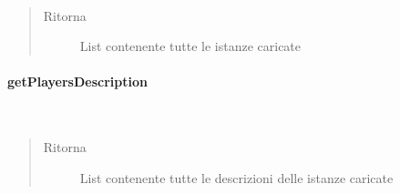 \documentclass[letterpaper,10pt,italian,openany,oneside]{sphinxmanual}
\begin{document}
\begin{fulllineitems}
\label{\detokenize{source/it/unicam/cs/pa/mastermind/factories/PlayerFactoryRegistry:it.unicam.cs.pa.mastermind.factories.PlayerFactoryRegistry.getPlayerFactoriesInstances()}}~\begin{quote}\begin{description}
\item[{Ritorna}] \leavevmode
List contenente tutte le istanze  caricate

\end{description}\end{quote}

\end{fulllineitems}



\paragraph{getPlayersDescription}
\label{\detokenize{source/it/unicam/cs/pa/mastermind/factories/PlayerFactoryRegistry:getplayersdescription}}

\begin{fulllineitems}
\label{\detokenize{source/it/unicam/cs/pa/mastermind/factories/PlayerFactoryRegistry:it.unicam.cs.pa.mastermind.factories.PlayerFactoryRegistry.getPlayersDescription()}}~\begin{quote}\begin{description}
\item[{Ritorna}] \leavevmode
List contenente tutte le descrizioni delle istanze  caricate

\end{description}\end{quote}

\end{fulllineitems}
\end{document}
